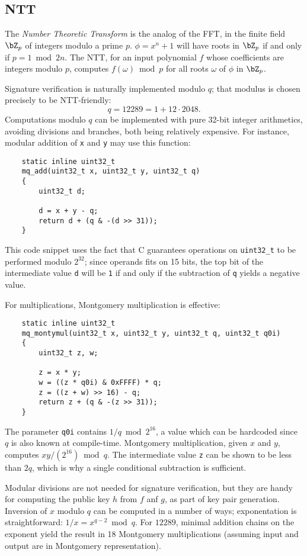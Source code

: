 \subsection{NTT}

The \emph{Number Theoretic Transform} is the analog of the FFT, in the
finite field $\bZ_p$ of integers modulo a prime $p$.
$\phi = x^n+1$ will have roots in $\bZ_p$ if and only if $p = 1\bmod
2n$. The NTT, for an input
polynomial $f$ whose coefficients are integers modulo $p$, computes
$f(\omega) \bmod p$ for all roots $\omega$ of $\phi$ in $\bZ_p$.

Signature verification is naturally implemented modulo $q$; that
modulus is chosen precisely to be NTT-friendly:
$$q = 12289 = 1 + 12\cdot 2048.$$
Computations modulo $q$ can be implemented with pure 32-bit integer
arithmetics, avoiding divisions and branches, both being relatively
expensive. For instance, modular addition of \verb+x+ and \verb+y+
may use this function:
\begin{verbatim}
    static inline uint32_t
    mq_add(uint32_t x, uint32_t y, uint32_t q)
    {
        uint32_t d;

        d = x + y - q;
        return d + (q & -(d >> 31));
    }
\end{verbatim}
This code snippet uses the fact that C guarantees operations on
\verb+uint32_t+ to be performed modulo $2^{32}$; since operands fits on
15 bits, the top bit of the intermediate value \verb+d+ will be \verb+1+
if and only if the subtraction of \verb+q+ yields a negative value.

For multiplications, Montgomery multiplication is effective:
\begin{verbatim}
    static inline uint32_t
    mq_montymul(uint32_t x, uint32_t y, uint32_t q, uint32_t q0i)
    {
        uint32_t z, w;

        z = x * y;
        w = ((z * q0i) & 0xFFFF) * q;
        z = ((z + w) >> 16) - q;
        return z + (q & -(z >> 31));
    }
\end{verbatim}
The parameter \verb+q0i+ contains $1/q \bmod 2^{16}$, a value which can
be hardcoded since $q$ is also known at compile-time. Montgomery
multiplication, given $x$ and $y$, computes $xy/(2^{16}) \bmod q$. The
intermediate value \verb+z+ can be shown to be less than $2q$, which is
why a single conditional subtraction is sufficient.

Modular divisions are not needed for signature verification, but they
are handy for computing the public key $h$ from $f$ anf $g$, as part of
key pair generation. Inversion of $x$ modulo $q$ can be computed in
a number of ways; exponentation is straightforward:
$1/x = x^{q-2} \bmod q$. For $12289$, minimal addition
chains on the exponent yield the result in 18 Montgomery multiplications
(assuming input and output are in Montgomery representation).

